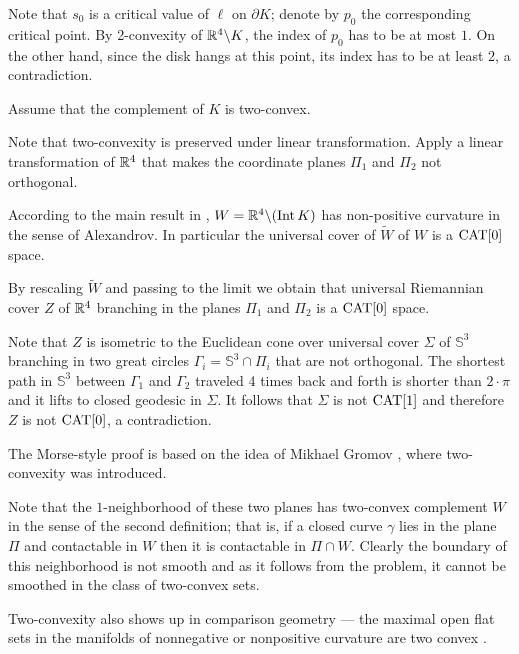 Note that $s_0$ is a critical value of $\ell$ on $\partial K$;
denote by $p_0$ the corresponding critical point.
By 2-convexity of $\mathbb{R}^4\backslash K$,
the index of $p_0$ has to be at most $1$.
On the other hand, since the disk hangs at this point,
its index has to be at least $2$,
 a contradiction.\qeds

Assume that the complement of $K$ is two-convex.

Note that two-convexity is preserved under linear transformation.
Apply a linear transformation of $\mathbb{R}^4$ that makes the coordinate planes $\Pi_1$ and $\Pi_2$ not orthogonal.

According to the main result in \cite{ABB}, $W\z=\RR^4\backslash (\Int K)$ has non-positive curvature in the sense of Alexandrov.
In particular the universal cover of $\tilde W$ of $W$ is a $\operatorname{\rm CAT}\nolimits[0]$ space.

By rescaling $\tilde W$ and passing to the limit we obtain that universal Riemannian cover $Z$ of $\mathbb{R}^4$ branching in the planes $\Pi_1$ and $\Pi_2$ is a $\operatorname{\rm CAT}\nolimits[0]$ space.

Note that $Z$ is isometric to the Euclidean cone over universal cover $\Sigma$ of $\mathbb{S}^3$ branching in two great circles $\Gamma_i=\mathbb{S}^3\cap \Pi_i$ that are not orthogonal.
The shortest path in $\mathbb{S}^3$ between $\Gamma_1$ and $\Gamma_2$ traveled 4 times back and forth is shorter than $2\cdot\pi$ and it lifts to closed geodesic in $\Sigma$.
It follows that $\Sigma$ is not $\operatorname{\rm CAT}\nolimits[1]$ and therefore $Z$ is not $\operatorname{\rm CAT}\nolimits[0]$, a contradiction.\qeds

The Morse-style proof is based on the idea of Mikhael Gromov \cite[see][\S\textonehalf]{gromov-SGMC}, where two-convexity was introduced.

Note that the $1$-neighborhood of these two planes has two-convex complement $W$ in the sense of the second definition;
that is, if a closed curve $\gamma$ lies in the plane $\Pi$
and contactable in $W$ then it is contactable in $\Pi\cap W$.
Clearly the boundary of this neighborhood is not smooth
and as it follows from the problem, it cannot be smoothed in the class of two-convex sets. 

Two-convexity also shows up in comparison geometry --- the maximal open flat sets in the manifolds of nonnegative or nonpositive curvature are two convex \cite[see][]{panov-petrunin}.


